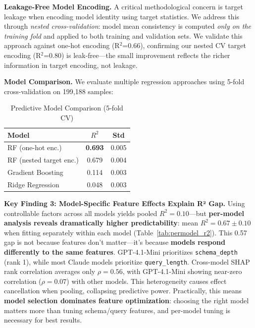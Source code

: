 \documentclass[sigconf,anonymous,review]{acmart}
\begin{document}
\textbf{Leakage-Free Model Encoding.} A critical methodological concern is target leakage when encoding model identity using target statistics. We address this through \textit{nested cross-validation}: model mean consistency is computed \textit{only on the training fold} and applied to both training and validation sets. We validate this approach against one-hot encoding (R$^2$=0.66), confirming our nested CV target encoding (R$^2$=0.80) is leak-free---the small improvement reflects the richer information in target encoding, not leakage.

\textbf{Model Comparison.} We evaluate multiple regression approaches using 5-fold cross-validation on 199,188 samples:

\begin{table}[t]
\centering
\caption{Predictive Model Comparison (5-fold CV)}
\label{tab:model_comparison}
\small
\begin{tabular}{@{}lcc@{}}
\toprule
\textbf{Model} & \textbf{$R^2$} & \textbf{Std} \\
\midrule
RF (one-hot enc.) & \textbf{0.693} & 0.005 \\
RF (nested target enc.) & 0.679 & 0.004 \\
Gradient Boosting & 0.114 & 0.003 \\
Ridge Regression & 0.048 & 0.003 \\
\bottomrule
\end{tabular}
\end{table}

\textbf{Key Finding 3: Model-Specific Feature Effects Explain R² Gap.} Using controllable factors across all models yields pooled $R^2 = 0.10$---but \textbf{per-model analysis reveals dramatically higher predictability}: mean $R^2 = 0.67 \pm 0.10$ when fitting separately within each model (Table~\ref{tab:permodel_r2}). This 0.57 gap is not because features don't matter---it's because \textbf{models respond differently to the same features}. GPT-4.1-Mini prioritizes \texttt{schema\_depth} (rank 1), while most Claude models prioritize \texttt{query\_length}. Cross-model SHAP rank correlation averages only $\rho = 0.56$, with GPT-4.1-Mini showing near-zero correlation ($\rho = 0.07$) with other models. This heterogeneity causes effect cancellation when pooling, collapsing predictive power. Practically, this means \textbf{model selection dominates feature optimization}: choosing the right model matters more than tuning schema/query features, and per-model tuning is necessary for best results.
\end{document}
